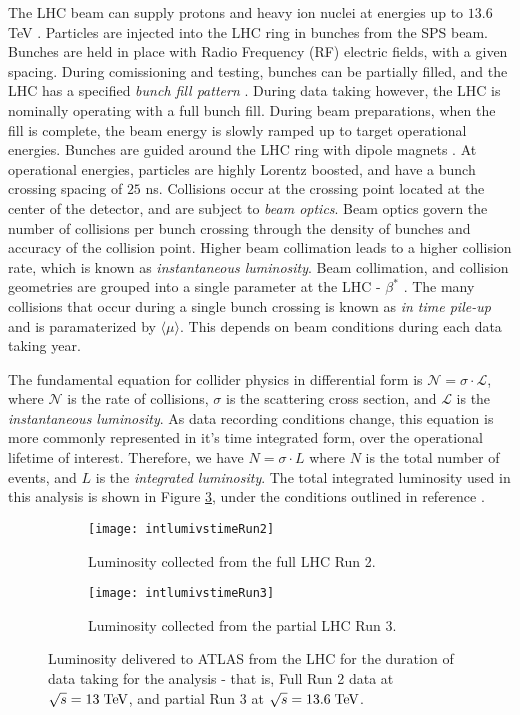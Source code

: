 \documentclass[12pt]{article}
\begin{document}
The LHC beam can supply protons and heavy ion nuclei at energies up to $13.6$
TeV \cite{Aad_2024}. Particles are injected into the LHC
ring in bunches from the SPS beam. Bunches are held in place with Radio
Frequency (RF) electric fields, with a given spacing. During comissioning and
testing, bunches can be partially filled, and the LHC has a specified
\textit{bunch fill pattern} \cite{bunch_filling_schemes_bailey}. During data
taking however, the LHC is nominally operating with a full bunch fill. During
beam preparations, when the fill is complete, the beam energy is slowly ramped
up to target operational energies. Bunches are guided around the LHC ring with
dipole magnets \cite{The_ATLAS_Collaboration_2008,
bunch_filling_schemes_bailey}. At operational energies, particles are highly
Lorentz boosted, and have a bunch crossing spacing of $25$ ns. Collisions occur
at the crossing point located at the center of the detector, and are subject to
\textit{beam optics}. Beam optics govern the number of collisions per bunch
crossing through the density of bunches and accuracy of the collision point.
Higher beam collimation leads to a higher collision rate, which is known as
\textit{instantaneous luminosity}. Beam collimation, and collision geometries
are grouped into a single parameter at the LHC - $\beta^*$ \cite{Aad_2024}. The
many collisions that occur during a single bunch crossing is known as \textit{in
time pile-up} and is paramaterized by $\langle\mu\rangle$. This depends on beam
conditions during each data taking year.

The fundamental equation for collider physics in differential form is
$\mathcal{N}=\sigma\cdot\mathscr{L}$, where $\mathcal{N}$ is the rate of
collisions, $\sigma$ is the scattering cross section, and $\mathscr{L}$ is the
\textit{instantaneous luminosity}. As data recording conditions change, this
equation is more commonly represented in it's time integrated form, over the
operational lifetime of interest. Therefore, we have $N=\sigma\cdot L$ where $N$
is the total number of events, and $L$ is the \textit{integrated luminosity}.
The total integrated luminosity used in this analysis is shown in Figure
\ref{fig:lhc_luminosity}, under the conditions outlined in reference
\cite{Aad_2024}. 

\begin{figure}[t!]
    \centering
    \begin{subfigure}[t]{.48\textwidth}
        \centering
        \texttt{[image: intlumivstimeRun2]}
        \caption{Luminosity collected from the full LHC Run 2.}
        \label{subfig:lumi_run2}
    \end{subfigure}
    \hfill
    \begin{subfigure}[t]{.48\textwidth}
        \centering
        \texttt{[image: intlumivstimeRun3]}
        \caption{Luminosity collected from the partial LHC Run 3.}
        \label{subfig:lumi_run3}
    \end{subfigure}
\caption{Luminosity delivered to ATLAS from the LHC for the duration of data
taking for the analysis - that is, Full Run 2 data at $\sqrt{s}=13\;\text{TeV}$, and
partial Run 3 at $\sqrt{s}=13.6\;\text{TeV}$.} %
\label{fig:lhc_luminosity}
\end{figure}
\end{document}
